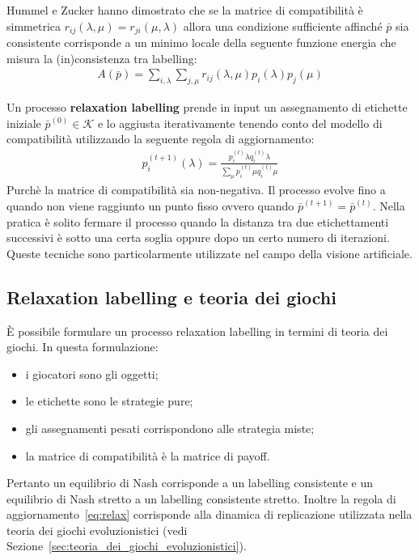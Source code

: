 	Hummel e Zucker hanno dimostrato che se la matrice di compatibilità è simmetrica $r_{ij}(\lambda, \mu) = r_{ji}(\mu, \lambda)$ allora una condizione sufficiente affinché $\bar{p}$ sia consistente corrisponde a un minimo locale della seguente funzione energia che misura la (in)consistenza tra labelling:
	\begin{align*}
		A(\bar{p}) = \sum_{i, \lambda} \sum_{j, \mu} r_{ij}(\lambda, \mu) p_i(\lambda) p_j(\mu)
	\end{align*}
	
	Un processo \textbf{relaxation labelling} prende in input un assegnamento di etichette iniziale $\bar{p}^{(0)} \in \mathcal{K}$ e lo aggiusta iterativamente tenendo conto del modello di compatibilità utilizzando la seguente regola di aggiornamento:
	\begin{align}
		p_i^{(t + 1)}(\lambda) = \frac{p_i^{(t)}\lambda q_i^{(t)} \lambda}{\displaystyle\sum_\mu p_i^{(t)}\mu q_i^{(t)} \mu}\label{eq:relax}
	\end{align}
	Purchè la matrice di compatibilità sia non-negativa. Il processo evolve fino a quando non viene raggiunto un punto fisso ovvero quando $\bar{p}^{(t + 1)} = \bar{p}^(t)$. Nella pratica è solito fermare il processo quando la distanza tra due etichettamenti successivi è sotto una certa soglia oppure dopo un certo numero di iterazioni. Queste tecniche sono particolarmente utilizzate nel campo della visione artificiale.
	
	\newpage
	
	\subsection{Relaxation labelling e teoria dei giochi} %
	\label{sub:relaxation_labelling_e_teoria_dei_giochi}
	È possibile formulare un processo relaxation labelling in termini di teoria dei giochi. In questa formulazione:
	\begin{itemize}
		\item i giocatori sono gli oggetti;
		\item le etichette sono le strategie pure;
		\item gli assegnamenti pesati corrispondono alle strategia miste;
		\item la matrice di compatibilità è la matrice di payoff.
	\end{itemize}
	Pertanto un equilibrio di Nash corrisponde a un labelling consistente e un equilibrio di Nash stretto a un labelling consistente stretto. Inoltre la regola di aggiornamento~\eqref{eq:relax} corrisponde alla dinamica di replicazione utilizzata nella teoria dei giochi evoluzionistici (vedi Sezione~\ref{sec:teoria_dei_giochi_evoluzionistici}).\\
	
